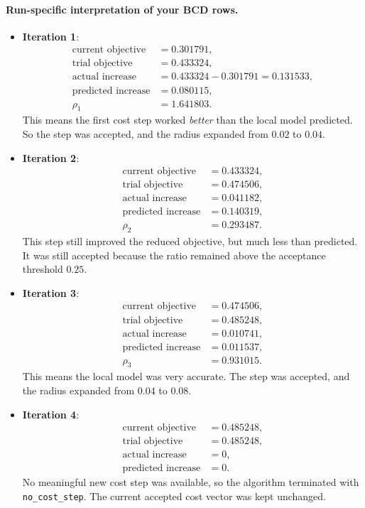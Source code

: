 \documentclass[11pt]{article}
\begin{document}
\paragraph{Run-specific interpretation of your BCD rows.}
\begin{itemize}
\item \textbf{Iteration 1}:
\begin{align*}
\text{current objective} &= 0.301791, \\
\text{trial objective} &= 0.433324, \\
\text{actual increase} &= 0.433324 - 0.301791 = 0.131533, \\
\text{predicted increase} &= 0.080115, \\
\rho_1 &= 1.641803.
\end{align*}
This means the first cost step worked \emph{better} than the local model
predicted. So the step was accepted, and the radius expanded from $0.02$ to
$0.04$.

\item \textbf{Iteration 2}:
\begin{align*}
\text{current objective} &= 0.433324, \\
\text{trial objective} &= 0.474506, \\
\text{actual increase} &= 0.041182, \\
\text{predicted increase} &= 0.140319, \\
\rho_2 &= 0.293487.
\end{align*}
This step still improved the reduced objective, but much less than predicted.
It was still accepted because the ratio remained above the acceptance threshold
$0.25$.

\item \textbf{Iteration 3}:
\begin{align*}
\text{current objective} &= 0.474506, \\
\text{trial objective} &= 0.485248, \\
\text{actual increase} &= 0.010741, \\
\text{predicted increase} &= 0.011537, \\
\rho_3 &= 0.931015.
\end{align*}
This means the local model was very accurate. The step was accepted, and the
radius expanded from $0.04$ to $0.08$.

\item \textbf{Iteration 4}:
\begin{align*}
\text{current objective} &= 0.485248, \\
\text{trial objective} &= 0.485248, \\
\text{actual increase} &= 0, \\
\text{predicted increase} &= 0.
\end{align*}
No meaningful new cost step was available, so the algorithm terminated with
\texttt{no\_cost\_step}. The current accepted cost vector was kept unchanged.
\end{itemize}
\end{document}
